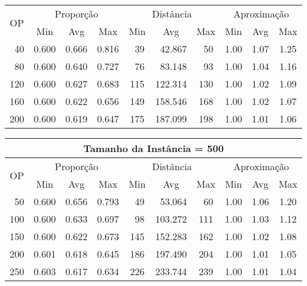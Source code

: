 \begin{table}[!tb]
\begin{center}
{\begin{tabular}{|c|c|c|c|c|c|c|c|c|c|}
\multirow{2}{*}{OP} & \multicolumn{3}{c|}{Proporção} & \multicolumn{3}{c|}{Distância} & \multicolumn{3}{c|}{Aproximação}   \\ \cline{2-10}
                    & Min       & Avg      & Max      & Min      & Avg      & Max     & Min     & Avg    & Max             \\ \hline
~40                 & 0.600     & 0.666    & 0.816    & ~39      & ~42.867  & ~50     & 1.00    & 1.07   & 1.25            \\ \hline
~80                 & 0.600     & 0.640    & 0.727    & ~76      & ~83.148  & ~93     & 1.00    & 1.04   & 1.16            \\ \hline
120                 & 0.600     & 0.627    & 0.683    & 115      & 122.314  & 130     & 1.00    & 1.02   & 1.09            \\ \hline
160                 & 0.600     & 0.622    & 0.656    & 149      & 158.546  & 168     & 1.00    & 1.02   & 1.07            \\ \hline
200                 & 0.600     & 0.619    & 0.647    & 175      & 187.099  & 198     & 1.00    & 1.01   & 1.06            \\ \hline
\end{tabular}%
\vspace{5pt}
\begin{tabular}{|c|c|c|c|c|c|c|c|c|c|}
\hline
\multicolumn{10}{|c|}{\bf Tamanho da Instância = 500}                                                                          \\ \hline
\multirow{2}{*}{OP} & \multicolumn{3}{c|}{Proporção} & \multicolumn{3}{c|}{Distância} & \multicolumn{3}{c|}{Aproximação}   \\ \cline{2-10}
                    & Min       & Avg      & Max      & Min      & Avg      & Max     & Min     & Avg    & Max             \\ \hline
~50                 & 0.600     & 0.656    & 0.793    & ~49      & ~53.064  & ~60     & 1.00    & 1.06   & 1.20            \\ \hline
100                 & 0.600     & 0.633    & 0.697    & ~98      & 103.272  & 111     & 1.00    & 1.03   & 1.12            \\ \hline
150                 & 0.600     & 0.622    & 0.673    & 145      & 152.283  & 162     & 1.00    & 1.02   & 1.08            \\ \hline
200                 & 0.601     & 0.618    & 0.645    & 186      & 197.490  & 204     & 1.00    & 1.01   & 1.05            \\ \hline
250                 & 0.603     & 0.617    & 0.634    & 226      & 233.744  & 239     & 1.00    & 1.01   & 1.04            \\ \hline
\end{tabular}%
}
\end{center}
\end{table}
